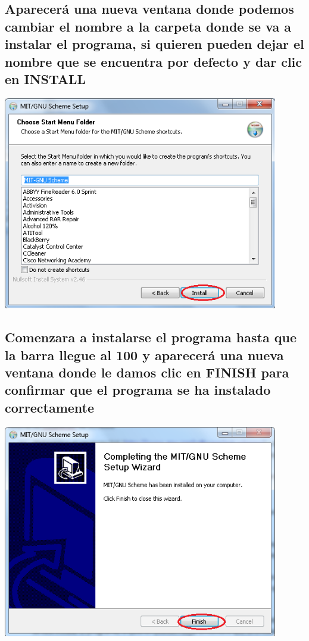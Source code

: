 \documentclass[11pt]{article} %
\begin{document}
\subsection{Aparecerá una nueva ventana donde podemos cambiar el nombre a la carpeta donde se va a instalar el programa, si quieren pueden dejar el nombre que se encuentra por defecto y dar clic en  INSTALL }
\begin{center}
\includegraphics[width=12cm]{5.png}
\end{center}

\subsection{Comenzara a instalarse el programa hasta que la barra llegue al 100 y aparecerá una nueva ventana donde le damos clic en FINISH para confirmar que el programa se ha instalado correctamente}
\begin{center}
\includegraphics[width=12cm]{6.png}
\end{center}
\end{document}
